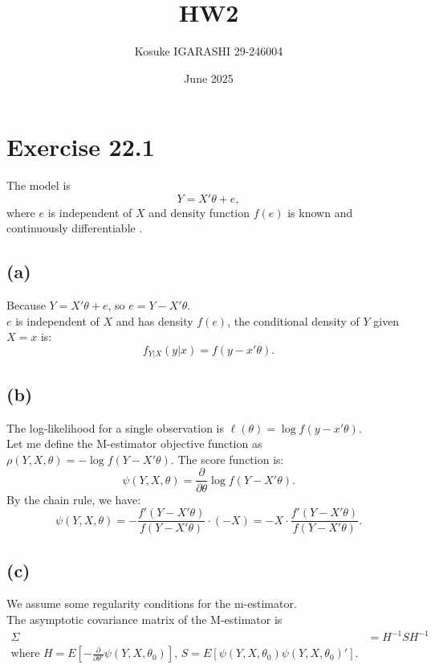 \documentclass{article}
\title{HW2}
\author{Kosuke IGARASHI 29-246004}
\date{June 2025}
\begin{document}
\maketitle

\section{Exercise 22.1}

The model is
\[
Y = X'\theta + e,
\]
where $e$ is independent of $X$ and density function $f(e)$ is known and continuously differentiable .

\bigskip

\subsection*{(a)}
Because $Y = X' \theta + e$, so $e = Y - X' \theta$.\\
$e$ is independent of $X$ and has density $f(e)$, the conditional density of $Y$ given $X = x$ is:
\[
f_{Y|X}(y|x) = f(y - x'\theta).
\]
\bigskip

\subsection*{(b)}
The log-likelihood for a single observation is $\ell(\theta) = \log f(y - x'\theta)$.\\
Let me define the M-estimator objective function as $\rho(Y,X,\theta) = -\log f(Y - X'\theta)$.
The score function is:
\[
\psi(Y,X,\theta) = \frac{\partial}{\partial \theta} \log f(Y - X'\theta).
\]
By the chain rule, we have:
\[
\psi(Y,X,\theta) = -\frac{f'(Y - X'\theta)}{f(Y - X'\theta)} \cdot (-X) = -X \cdot \frac{f'(Y - X'\theta)}{f(Y - X'\theta)}.
\]

\bigskip

\subsection*{(c)}
We assume some regularity conditions for the m-estimator.\\

The asymptotic covariance matrix of the M-estimator is
\begin{align*}
    \Sigma &= H^{-1} S H^{-1}\\
    \text{where } H = E\left[ -\frac{\partial}{\partial \theta'} \psi(Y,X,\theta_0) \right] \text{, } S = E\left[ \psi(Y,X,\theta_0) \psi(Y,X,\theta_0)' \right].
\end{align*}
\end{document}
